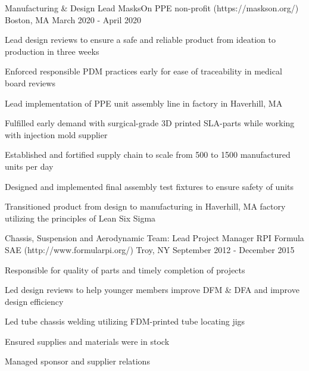 

\begin{cventries}

    
  \cventry
    {Manufacturing \& Design Lead} %
    {MasksOn PPE non-profit ({\tiny https://maskson.org/})} %
    {Boston, MA} %
    {March 2020 - April 2020} %
    {
      \begin{cvitems} %
        \item{Lead design reviews to ensure a safe and reliable product from ideation to production in three weeks}
        \item{Enforced responsible PDM practices early for ease of traceability in medical board reviews}
        \item{Lead implementation of PPE unit assembly line in factory in Haverhill, MA}
        \item{Fulfilled early demand with surgical-grade 3D printed SLA-parts while working with injection mold supplier}
        \item{Established and fortified supply chain to scale from 500 to 1500 manufactured units per day}
        \item{Designed and implemented final assembly test fixtures to ensure safety of units}
        \item{Transitioned product from design to manufacturing in Haverhill, MA factory utilizing the principles of Lean Six Sigma}
      \end{cvitems}
    }

  \cventry
    {Chassis, Suspension and Aerodynamic Team: Lead Project Manager} %
    {RPI Formula SAE ({\tiny http://www.formularpi.org/})} %
    {Troy, NY} %
    {September 2012 - December 2015} %
    {
      \begin{cvitems} %
        \item{Responsible for quality of parts and timely completion of projects}
        \item{Led design reviews to help younger members improve DFM \& DFA and improve design efficiency}
        \item{Led tube chassis welding utilizing FDM-printed tube locating jigs}
        \item{Ensured supplies and materials were in stock}
        \item{Managed sponsor and supplier relations}
      \end{cvitems}
    }
    

\end{cventries}
